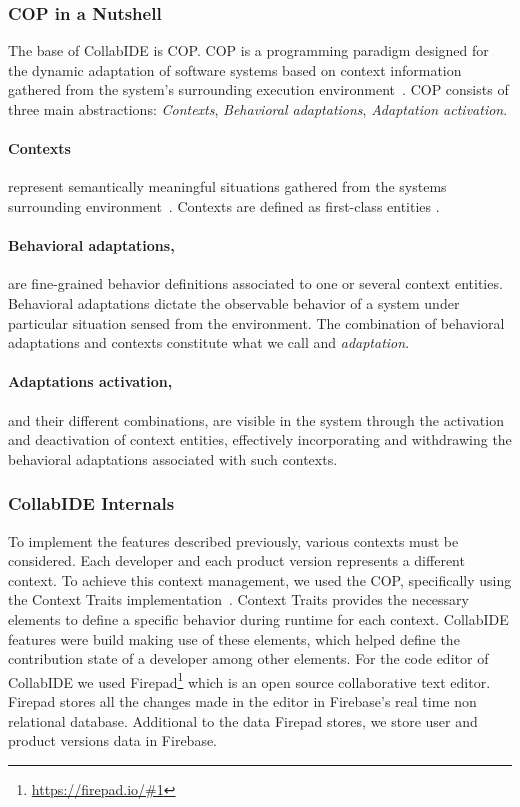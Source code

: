 \subsubsection{\ac{COP} in a Nutshell}
The base of CollabIDE is \acf{COP}. \ac{COP} is a programming paradigm designed for the dynamic adaptation of software systems based on context information gathered from the system's surrounding execution environment~\cite{salvaneschi+12survey}. \ac{COP} consists of three main abstractions: \emph{Contexts}, \emph{Behavioral adaptations}, \emph{Adaptation activation}.

\paragraph{Contexts} represent semantically meaningful situations gathered from the systems surrounding environment~\cite{dey01}. Contexts are defined as first-class entities .

\paragraph{Behavioral adaptations,} are fine-grained behavior definitions associated to one or several context entities. Behavioral adaptations dictate the observable behavior of a system under particular situation sensed from the environment. The combination of behavioral adaptations and contexts constitute what we call and \emph{adaptation}.

\paragraph{Adaptations activation,} and their different combinations, are visible in the system through the activation and deactivation of context entities, effectively incorporating and withdrawing the behavioral adaptations associated with such contexts.


\subsubsection{CollabIDE Internals}
To implement the features described previously, various contexts must be considered. Each developer 
and each product version represents a different context. To achieve this context management, we used 
the \ac{COP}, specifically using the Context Traits implementation~\cite{gonzalez13}. 
Context Traits provides the necessary elements to define a specific behavior during runtime for each 
context. CollabIDE features were build making use of these elements, which helped define the 
contribution state of a developer among other elements.
For the code editor of CollabIDE we used Firepad\footnote{\url{https://firepad.io/\#1}} which is an open 
source collaborative text editor. Firepad stores all the changes made in the editor in Firebase’s real 
time non relational database. Additional to the data Firepad stores, we store user and product versions 
data in Firebase.

\endinput
